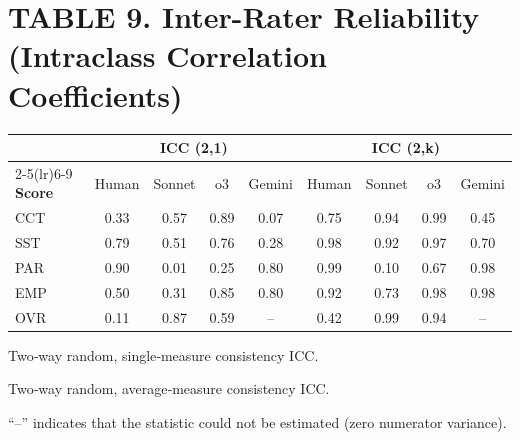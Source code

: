 \documentclass{wiley-article}
\begin{document}
\begin{table}[htbp] %
  \section*{TABLE 9. Inter-Rater Reliability (Intraclass Correlation Coefficients)}
  \centering
  \footnotesize
  \setlength{\tabcolsep}{4pt}
  \begin{threeparttable}
    \label{tab:icc}
    \begin{tabular}{l cccc cccc}
      \toprule
      & \multicolumn{4}{c}{\textbf{ICC (2,1)\tnote{a}}} &
        \multicolumn{4}{c}{\textbf{ICC (2,k)\tnote{b}}} \\
      \cmidrule(lr){2-5}\cmidrule(lr){6-9}
      \textbf{Score} & Human & Sonnet & o3 & Gemini &
                     Human & Sonnet & o3 & Gemini \\[2pt]
      \midrule
      CCT & 0.33 & 0.57 & 0.89 & 0.07 & 0.75 & 0.94 & 0.99 & 0.45 \\
      SST & 0.79 & 0.51 & 0.76 & 0.28 & 0.98 & 0.92 & 0.97 & 0.70 \\
      PAR & 0.90 & 0.01 & 0.25 & 0.80 & 0.99 & 0.10 & 0.67 & 0.98 \\
      EMP & 0.50 & 0.31 & 0.85 & 0.80 & 0.92 & 0.73 & 0.98 & 0.98 \\
      OVR & 0.11 & 0.87 & 0.59 & --   & 0.42 & 0.99 & 0.94 & --   \\
      \bottomrule
    \end{tabular}
    \begin{tablenotes}
      \scriptsize
      \item[a] Two‐way random, single‐measure consistency ICC.
      \item[b] Two‐way random, average‐measure consistency ICC.
      \item   “--” indicates that the statistic could not be estimated (zero numerator variance).
    \end{tablenotes}
  \end{threeparttable}
\end{table}



% 
\end{document}
